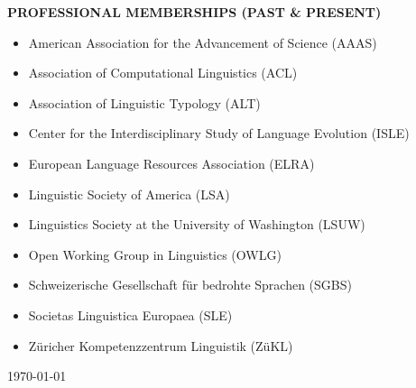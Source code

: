 \documentclass[11pt]{article}
\begin{document}
\vskip 20pt
\begin{flushleft}
{\bf PROFESSIONAL MEMBERSHIPS (PAST \& PRESENT)}
\end{flushleft}
\begin{itemize}
\item American Association for the Advancement of Science (AAAS)
\item Association of Computational Linguistics (ACL)
\item Association of Linguistic Typology (ALT)
\item Center for the Interdisciplinary Study of Language Evolution (ISLE)
\item European Language Resources Association (ELRA)
\item Linguistic Society of America (LSA)
\item Linguistics Society at the University of Washington (LSUW)
\item Open Working Group in Linguistics (OWLG)
\item Schweizerische Gesellschaft f{\"u}r bedrohte Sprachen (SGBS)
\item Societas Linguistica Europaea (SLE)
\item Z{\"u}richer Kompetenzzentrum Linguistik (Z{\"u}KL)
\end{itemize}

\vskip 20pt
\today
\end{document}
